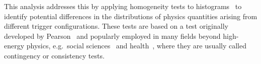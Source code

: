 This analysis addresses this by applying homogeneity tests to histograms~\cite{homogeneity_test} to identify potential differences in the distributions of physics quantities arising from different trigger configurations.
These tests are based on a test originally developed by Pearson~\cite{pearson1911probability} and popularly employed in many fields beyond high-energy physics, e.g.\ social sciences~\cite{wickens2014multiway} and health~\cite{ma2015homogeneity}, where they are usually called contingency or consistency tests.






